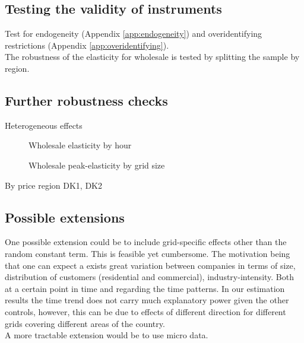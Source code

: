 \subsection{Testing the validity of instruments}
\label{subsec:r_validity}
Test for endogeneity (Appendix \ref{app:endogeneity}) and overidentifying restrictions (Appendix \ref{app:overidentifying}).
\medskip\\
The robustness of the elasticity for wholesale is tested by splitting the sample by region.


\subsection{Further robustness checks}
\label{subsec:r_robustness}
Heterogeneous effects
\begin{figure}[H]
  \centering
  \caption{Wholesale elasticity by hour}
  \label{fig:ws_elasticity_hour}
\end{figure}

\begin{figure}[H]
  \centering
  \caption{Wholesale peak-elasticity by grid size}
  \label{fig:ws_elasticity_grid}
\end{figure}


By price region DK1, DK2


\subsection{Possible extensions}
\label{subsec:discussion}
One possible extension could be to include grid-specific effects other than the random constant term. This is feasible yet cumbersome. The motivation being that one can expect a exists great variation between companies in terms of size, distribution of customers (residential and commercial), industry-intensity. Both at a certain point in time and regarding the time patterns. In our estimation results the time trend does not carry much explanatory power given the other controls, however, this can be due to effects of different direction for different grids covering different areas of the country.
\medskip\\
A more tractable extension would be to use micro data.
